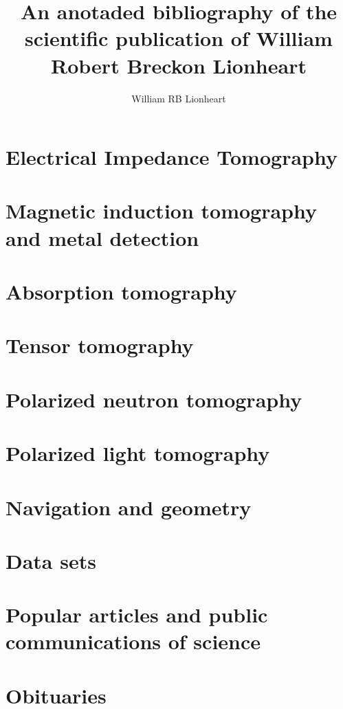\documentclass[]{article}
\title{An anotaded bibliography of the  scientific publication of William Robert Breckon Lionheart}
\author{William RB Lionheart}
\begin{document}
\maketitle



\section{Electrical Impedance Tomography}

\section{Magnetic induction tomography and metal detection}

\section{Absorption tomography}

\section{Tensor tomography}

\section{Polarized neutron tomography}

\section{Polarized light tomography}

\section{Navigation and geometry}

\section{Data sets}

\section{Popular articles and public communications of science}

\section{Obituaries}
\end{document}
